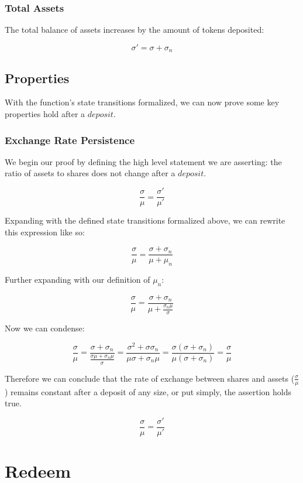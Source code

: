 \documentclass{article}
\begin{document}
\subsubsection{Total Assets}

The total balance of assets increases by the amount of tokens deposited:

$$ \sigma' = \sigma + \sigma_n $$

\subsection{Properties}

With the function's state transitions formalized, we can now prove some key properties hold after a $deposit$.

\subsubsection{Exchange Rate Persistence}

We begin our proof by defining the high level statement we are asserting: the ratio of assets to shares does not change after a $deposit$.

$$ \frac{\sigma}{\mu} = \frac{\sigma'}{\mu'} $$

Expanding with the defined state transitions formalized above, we can rewrite this expression like so:

$$ \frac{\sigma}{\mu} = \frac{\sigma + \sigma_n}{\mu + \mu_n} $$

Further expanding with our definition of $\mu_n$:

$$ \frac{\sigma}{\mu} = \frac{\sigma + \sigma_n}{\mu + \frac{\sigma_n\mu}{\sigma}} $$

Now we can condense:

$$ \frac{\sigma}{\mu} = \frac{\sigma + \sigma_n}{\frac{\sigma\mu + \sigma_n\mu}{\sigma}} = \frac{\sigma^{2} + \sigma\sigma_n}{\mu\sigma + \sigma_n\mu} = \frac{\sigma(\sigma + \sigma_n)}{\mu(\sigma + \sigma_n)} = \frac{\sigma}{\mu} $$

Therefore we can conclude that the rate of exchange between shares and assets ($\frac{\sigma}{\mu}$) remains constant after a deposit of any size, or put simply, the assertion holds true.

$$ \frac{\sigma}{\mu} = \frac{\sigma'}{\mu'} $$

\section{Redeem}
\end{document}

